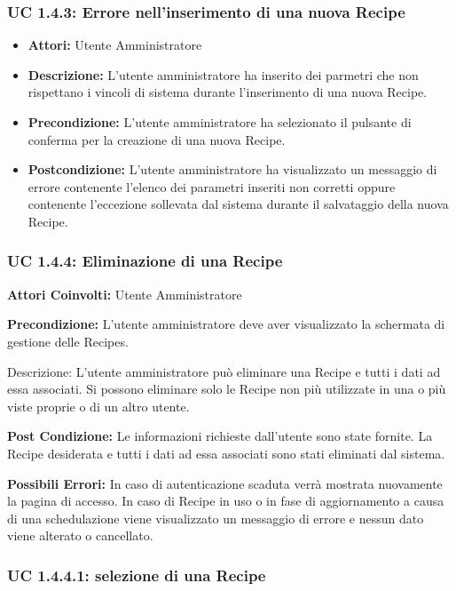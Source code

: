 \subsubsection{UC 1.4.3: Errore nell'inserimento di una nuova Recipe}

\begin{itemize}
\item \textbf{Attori:} Utente Amministratore
\item \textbf{Descrizione:} L'utente amministratore ha inserito dei parmetri che non rispettano i vincoli di sistema durante l'inserimento di una nuova Recipe.
\item \textbf{Precondizione:} L'utente amministratore ha selezionato il pulsante di conferma per la creazione di una nuova Recipe.
\item \textbf{Postcondizione:} L'utente amministratore ha visualizzato un messaggio di errore contenente l'elenco dei parametri inseriti non corretti oppure contenente l'eccezione sollevata dal sistema durante il salvataggio della nuova Recipe.
\end{itemize}

\subsubsection{UC 1.4.4: Eliminazione di una Recipe}

\begin{itemize}
\textbf{Attori Coinvolti:}
Utente Amministratore

\textbf{Precondizione:}
L'utente amministratore deve aver visualizzato la schermata di gestione delle Recipes.

Descrizione:
L'utente amministratore può eliminare una Recipe e tutti i dati ad essa associati.
Si possono eliminare solo le Recipe non più utilizzate in una o più viste proprie o di un altro utente.    

\textbf{Post Condizione:}
Le informazioni richieste dall'utente sono state fornite.
La Recipe desiderata e tutti i dati ad essa associati sono stati eliminati dal sistema.

\textbf{Possibili Errori:}
In caso di autenticazione scaduta verrà mostrata nuovamente la pagina di accesso.
In caso di Recipe in uso o in fase di aggiornamento a causa di una schedulazione viene visualizzato un messaggio di errore e nessun dato viene alterato o cancellato.
\end{itemize}

\subsubsection{UC 1.4.4.1: selezione di una Recipe}

